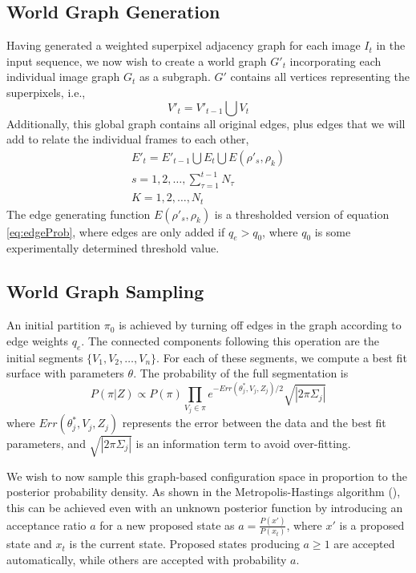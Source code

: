 \documentclass[10pt,letterpaper]{article}
\begin{document}
\subsection{World Graph Generation}
	Having generated a weighted superpixel adjacency graph for each image $I_t$ in the input sequence, we now wish to create a world graph $G'_t$ incorporating each individual image graph $G_t$ as a subgraph. $G'$ contains all vertices representing the superpixels, i.e.,
\begin{equation}
	V'_t=V'_{t-1}{\bigcup}V_t
\end{equation}
	 Additionally, this global graph contains all original edges, plus edges that we will add to relate the individual frames to each other,
\begin{eqnarray}
	 E'_t=E'_{t-1}{\bigcup}E_t{\bigcup}E(\rho'_s,\rho_k) \\
s=1,2,\ldots,\sum_{\tau=1}^{t-1}{N_\tau}\nonumber \\
K=1,2,\ldots,N_t\nonumber
\end{eqnarray}	 
	The edge generating function $E(\rho'_s,\rho_k)$ is a thresholded version of equation \ref{eq:edgeProb}, where edges are only added if $q_e>q_0$, where $q_0$ is some experimentally determined threshold value.
	

\subsection{World Graph Sampling}
	An initial partition $\pi_0$ is achieved by turning off edges in the graph according to edge weights $q_e$. The connected components following this operation are the initial segments $\{V_1,V_2,\ldots,V_n\}$. For each of these segments, we compute a best fit surface with parameters $\theta$. The probability of the full segmentation is
\begin{equation}
P(\pi|Z) \propto P(\pi)\prod_{V_j\in \pi}e^{- Err(\theta_{j}^*, V_j,Z_j)/2}\sqrt{|2\pi\Sigma_j|}
\end{equation}
where $Err(\theta_{j}^*, V_j,Z_j)$ represents the error between the data and the best fit parameters, and $\sqrt{|2\pi\Sigma_j|}$ is an information term to avoid over-fitting.

	We wish to now sample this graph-based configuration space in proportion to the posterior probability density. As shown in the Metropolis-Hastings algorithm (\cite{metropolis1953equation}), this can be achieved even with an unknown posterior function by introducing an acceptance ratio $a$ for a new proposed state as $a=\frac{P(x')}{P(x_t)}$, where $x'$ is a proposed state and $x_t$ is the current state. Proposed states producing $a\geq 1$ are accepted automatically, while others are accepted with probability $a$.
	
\end{document}
